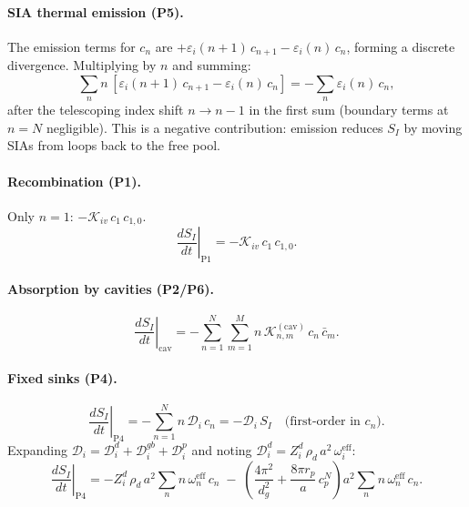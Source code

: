 \paragraph{SIA thermal emission (P5).}
The emission terms for $c_n$ are $+\varepsilon_i(n{+}1)\,c_{n+1} -
\varepsilon_i(n)\,c_n$, forming a discrete divergence. Multiplying by $n$
and summing:
\begin{equation}\label{eq:P5_SI}
    \sum_n n\,[\varepsilon_i(n{+}1)\,c_{n+1} - \varepsilon_i(n)\,c_n]
    = -\sum_n \varepsilon_i(n)\,c_n,
\end{equation}
after the telescoping index shift $n \to n-1$ in the first sum (boundary
terms at $n=N$ negligible). This is a negative contribution: emission
reduces $S_I$ by moving SIAs from loops back to the free pool.

\paragraph{Recombination (P1).}
Only $n=1$: $-\mathcal{K}_{iv}\,c_1\,c_{1,0}$.
\begin{equation}\label{eq:P1_SI}
    \left.\frac{dS_I}{dt}\right|_{\mathrm{P1}} = -\mathcal{K}_{iv}\,c_1\,c_{1,0}.
\end{equation}

\paragraph{Absorption by cavities (P2/P6).}
\begin{equation}\label{eq:P2_SI}
    \left.\frac{dS_I}{dt}\right|_{\mathrm{cav}}
    = -\sum_{n=1}^{N}\sum_{m=1}^{M}
      n\,\mathcal{K}_{n,m}^{(\mathrm{cav})}\,c_n\,\bar{c}_m.
\end{equation}

\paragraph{Fixed sinks (P4).}
\begin{equation}\label{eq:P4_SI}
    \left.\frac{dS_I}{dt}\right|_{\mathrm{P4}}
    = -\sum_{n=1}^{N} n\,\mathcal{D}_i\,c_n
    = -\mathcal{D}_i\,S_I \quad \text{(first-order in }c_n\text{)}.
\end{equation}
Expanding $\mathcal{D}_i = \mathcal{D}_i^d + \mathcal{D}_i^{gb} +
\mathcal{D}_i^p$ and noting $\mathcal{D}_i^d = Z_i^d\,\rho_d\,a^2\,
\omega_i^{\mathrm{eff}}$:
\begin{equation}
    \left.\frac{dS_I}{dt}\right|_{\mathrm{P4}}
    = -Z_i^d\,\rho_d\,a^2\sum_n n\,\omega_n^{\mathrm{eff}}\,c_n
    \;-\; \left(\frac{4\pi^2}{d_g^2} + \frac{8\pi r_p}{a}\,c_p^N\right)
      a^2\sum_n n\,\omega_n^{\mathrm{eff}}\,c_n.
\end{equation}

